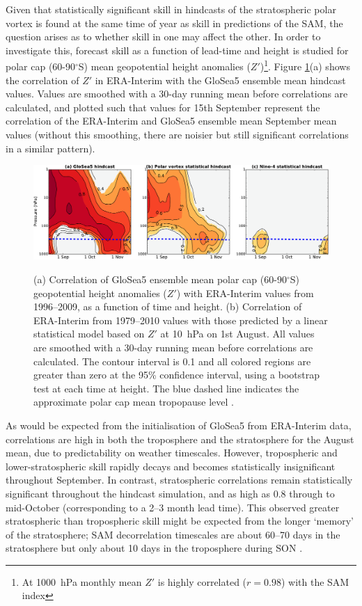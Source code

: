 Given that statistically significant skill in hindcasts of the stratospheric
polar vortex is found at the same time of year as skill in predictions of the
SAM, the question arises as to whether skill in one may affect the other. In
order to investigate this, forecast skill as a function of lead-time and height
is studied for polar cap (60-90$^{\circ}$S) mean geopotential height anomalies
($Z'$)\footnote{At 1000~hPa monthly mean $Z'$ is highly correlated ($r=0.98$)
  with the SAM index}. Figure \ref{fig:gph_lag_corr}(a) shows the correlation of
$Z'$ in ERA-Interim with the GloSea5 ensemble mean hindcast values. Values are
smoothed with a 30-day running mean before correlations are calculated, and
plotted such that values for 15th September represent the correlation of the
ERA-Interim and GloSea5 ensemble mean September mean values (without this
smoothing, there are noisier but still significant correlations in a similar
pattern).

\begin{figure}[t]
  \noindent\includegraphics[width=\textwidth,angle=0]{figures/chapter-seasonal/lag_corr_crop.pdf}\\
  \caption[Lag-height correlation of GloSea5 polar cap geopotential height]{(a)
Correlation of GloSea5 ensemble mean polar cap (60-90$^{\circ}$S) geopotential
height anomalies ($Z'$) with ERA-Interim values from 1996--2009, as a function
of time and height. (b) Correlation of ERA-Interim from 1979--2010 values with
those predicted by a linear statistical model based on $Z'$ at 10~hPa on 1st
August. All values are smoothed with a 30-day running mean before correlations
are calculated. The contour interval is 0.1 and all colored regions are greater
than zero at the 95\% confidence interval, using a bootstrap test at each time
at height. The blue dashed line indicates the approximate polar cap mean
tropopause level \citep{Wilcox2012}.} \label{fig:gph_lag_corr}
\end{figure}

As would be expected from the initialisation of GloSea5 from ERA-Interim data,
correlations are high in both the troposphere and the stratosphere for the
August mean, due to predictability on weather timescales. However, tropospheric
and lower-stratospheric skill rapidly decays and becomes statistically
insignificant throughout September. In contrast, stratospheric correlations
remain statistically significant throughout the hindcast simulation, and as high
as 0.8 through to mid-October (corresponding to a 2--3 month lead time). This
observed greater stratospheric than tropospheric skill might be expected from
the longer `memory' of the stratosphere; SAM decorrelation timescales are about
60--70 days in the stratosphere but only about 10 days in the troposphere during
SON \citep{Simpson2011}.

